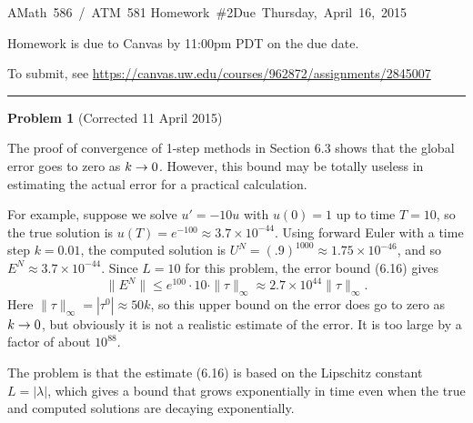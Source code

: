 \documentclass[10pt]{article}
\begin{document}
\hfill\vbox{\hbox{AMath 586 / ATM 581}
\hbox{Homework \#2}\hbox{Due Thursday, April 16, 2015}}

\vskip 5pt

Homework is due to Canvas by 11:00pm PDT on the due date.

To submit, see \url{https://canvas.uw.edu/courses/962872/assignments/2845007}


\vskip 1cm
\hrule
{\bf Problem 1}  (Corrected 11 April 2015)


The proof of convergence of 1-step methods in Section 6.3 shows that the 
global error goes to zero as $k\rightarrow 0$.
However, this bound may be totally useless in estimating the actual error
for a practical calculation.

For example, suppose we solve $u'=-10u$ with $u(0)=1$ up to time $T=10$, so
the true solution is $u(T)=e^{-100} \approx 3.7\times 10^{-44}$.
Using forward Euler with a time step $k=0.01$,  
the computed solution is $U^N = (.9)^{1000}\approx 1.75 \times
10^{-46}$, and so $E^N \approx 3.7 \times 10^{-44}$.
Since $L=10$ for this problem, the error bound (6.16) gives
\begin{equation}\label{eq:1}
\|E^N\| \leq e^{100}\cdot 10 \cdot \|\tau \|_\infty \approx 2.7 \times
10^{44} \|\tau\|_\infty.
\end{equation} 
Here $\|\tau\|_\infty =|\tau^0| \approx 50 k$, so this upper bound on the
error does go to zero as $k\rightarrow 0$, but obviously it is not a realistic
estimate of the error. It is too large by a factor of about $10^{88}$.

The problem is that the estimate (6.16) is based on the Lipschitz
constant $L=|\lambda|$, which gives a bound that grows exponentially in time
even when the true and computed solutions are decaying exponentially.
\end{document}
